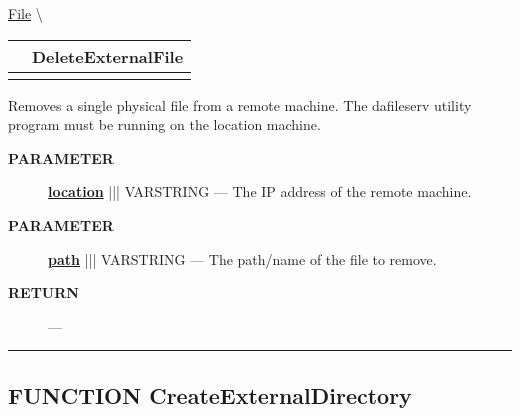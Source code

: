 \hypertarget{ecldoc:file.deleteexternalfile}{}
\hspace{0pt} \hyperlink{ecldoc:File}{File} \textbackslash 

{\renewcommand{\arraystretch}{1.5}
\begin{tabularx}{\textwidth}{|>{\raggedright\arraybackslash}l|X|}
\hline
\hspace{0pt}\mytexttt{\color{red} } & \textbf{DeleteExternalFile} \\
\hline
\multicolumn{2}{|>{\raggedright\arraybackslash}X|}{\hspace{0pt}\mytexttt{\color{param} (varstring location, varstring path)}} \\
\hline
\end{tabularx}
}

\par





Removes a single physical file from a remote machine. The dafileserv utility program must be running on the location machine.






\par
\begin{description}
\item [\colorbox{tagtype}{\color{white} \textbf{\textsf{PARAMETER}}}] \textbf{\underline{location}} ||| VARSTRING --- The IP address of the remote machine.
\item [\colorbox{tagtype}{\color{white} \textbf{\textsf{PARAMETER}}}] \textbf{\underline{path}} ||| VARSTRING --- The path/name of the file to remove.
\end{description}







\par
\begin{description}
\item [\colorbox{tagtype}{\color{white} \textbf{\textsf{RETURN}}}] \textbf{} --- 
\end{description}




\rule{\linewidth}{0.5pt}
\subsection*{\textsf{\colorbox{headtoc}{\color{white} FUNCTION}
CreateExternalDirectory}}

